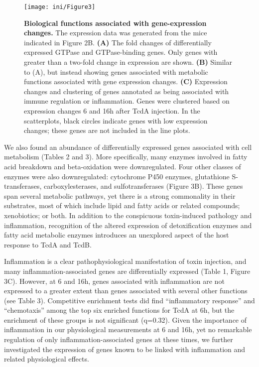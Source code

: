 \begin{figure}[h!]
  \centering
  \texttt{[image: ini/Figure3]}
  \caption[Biological functions associated with gene-expression changes]{
       \textbf{Biological functions associated with gene-expression changes.}
       The expression data was generated from the mice indicated in Figure 2B. \textbf{(A)} The fold changes of differentially expressed GTPase and GTPase-binding genes. Only genes with greater than a two-fold change in expression are shown. \textbf{(B)} Similar to (A), but instead showing genes associated with metabolic functions associated with gene expression changes. \textbf{(C)} Expression changes and clustering of genes annotated as being associated with immune regulation or inflammation. Genes were clustered based on expression changes 6 and 16h after TcdA injection. In the scatterplots, black circles indicate genes with low expression changes; these genes are not included in the line plots.
  }
  \label{ini:fig3}
\end{figure}


We also found an abundance of differentially expressed genes associated with cell metabolism (Tables 2 and 3). More specifically, many enzymes involved in fatty acid breakdown and beta-oxidation were downregulated. Four other classes of enzymes were also downregulated: cytochrome P450 enzymes, glutathione S-transferases, carboxylesterases, and sulfotransferases (Figure 3B). These genes span several metabolic pathways, yet there is a strong commonality in their substrates, most of which include lipid and fatty acids or related compounds; xenobiotics; or both. In addition to the conspicuous toxin-induced pathology and inflammation, recognition of the altered expression of detoxification enzymes and fatty acid metabolic enzymes introduces an unexplored aspect of the host response to TcdA and TcdB.

Inflammation is a clear pathophysiological manifestation of toxin injection, and many inflammation-associated genes are differentially expressed (Table 1, Figure 3C). However, at 6 and 16h, genes associated with inflammation are not expressed to a greater extent than genes associated with several other functions (see Table 3). Competitive enrichment tests did find “inflammatory response” and “chemotaxis” among the top six enriched functions for TcdA at 6h, but the enrichment of these groups is not significant (q=0.32). Given the importance of inflammation in our physiological measurements at 6 and 16h, yet no remarkable regulation of only inflammation-associated genes at these times, we further investigated the expression of genes known to be linked with inflammation and related physiological effects.

